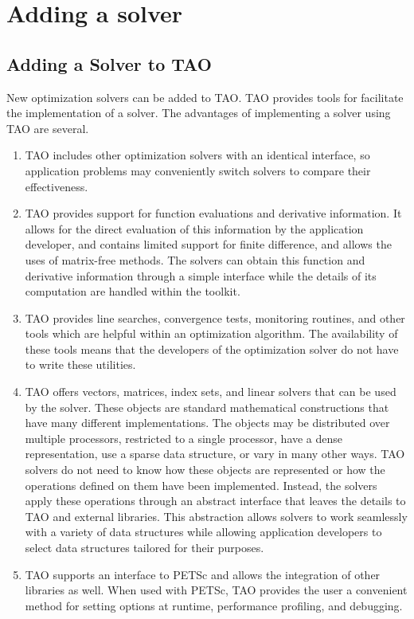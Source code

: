 
\chapter{Adding a solver}
\label{chapter:addsolver}

\section{Adding a Solver to TAO}

New optimization solvers can be added to TAO.  TAO provides tools for
facilitate the implementation of a solver.  The advantages of implementing
a solver using TAO are several.

\begin{enumerate}
\item TAO includes other optimization solvers with an identical interface, 
so application problems may
conveniently switch solvers to compare their effectiveness.

\item TAO provides support for function evaluations and
derivative information.  It allows for the direct evaluation
of this information by the application developer, 
and contains limited support for finite difference, and
allows the uses of matrix-free methods.
The solvers can obtain this function and derivative information
through a simple interface  while the details of its computation 
are handled within the toolkit.

\item TAO provides line searches, convergence
tests, monitoring routines, and other tools
which are helpful within an optimization algorithm.
The availability
of these tools means that the developers of the optimization
solver do not have to write these utilities.

\item TAO offers vectors, matrices, index sets, and linear solvers
that can be used by the solver.  These objects are standard mathematical
constructions that have many different implementations.
The objects may be distributed over multiple processors, restricted to
a single processor, have a dense representation, 
use a sparse data structure, or vary in many other ways.  
TAO solvers do not need to know how
these objects are represented or how the operations defined on them
have been implemented.  Instead, the solvers apply these operations
through an abstract interface that leaves the details to TAO
and external libraries.
This abstraction allows solvers to work seamlessly with a variety
of data structures while allowing application developers to select 
data structures tailored for their purposes.

\item TAO supports an interface to PETSc and
allows the integration of other libraries as well.
When used with PETSc, TAO provides the user a convenient
method for setting options at runtime, performance profiling, and debugging.

\end{enumerate}

